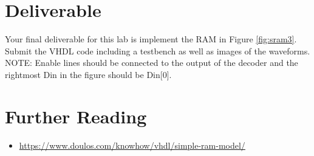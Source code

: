 \documentclass[a4paper, 11pt,oneside]{article}
\begin{document}
\section{Deliverable}
Your final deliverable for this lab is implement the RAM in Figure 
 \ref{fig:sram3}. Submit the VHDL code including a testbench as well as images 
of the waveforms. NOTE: Enable lines should be connected to the output of the 
decoder and the rightmost Din in the figure should be Din[0].

\section{Further Reading}
\begin{itemize}
\item 
\href{https://www.doulos.com/knowhow/vhdl/simple-ram-model/}
{https://www.doulos.com/knowhow/vhdl/simple-ram-model/}
\end{itemize}





\nocite{*}
\end{document}
